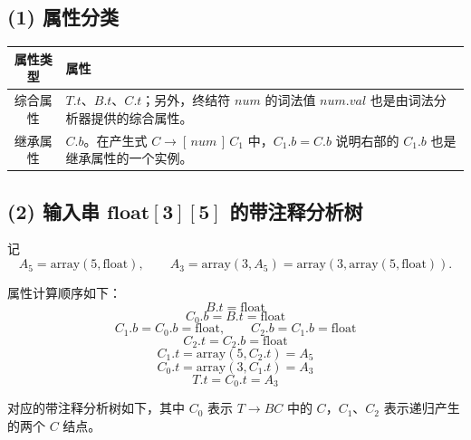 \documentclass[12pt]{article}
\begin{document}
\subsection*{(1) 属性分类}

\begin{center}
\begin{tabular}{|c|p{10cm}|}
\hline
属性类型 & 属性 \\
\hline
综合属性 & $T.t$、$B.t$、$C.t$；另外，终结符 $num$ 的词法值 $num.val$ 也是由词法分析器提供的综合属性。 \\
\hline
继承属性 & $C.b$。在产生式 $C \to [\,num\,]\,C_1$ 中，$C_1.b=C.b$ 说明右部的 $C_1.b$ 也是继承属性的一个实例。 \\
\hline
\end{tabular}
\end{center}

\subsection*{(2) 输入串 $\mathbf{float[3][5]}$ 的带注释分析树}

记
\[
A_5=\mathrm{array}(5,\mathrm{float}),\qquad
A_3=\mathrm{array}(3,A_5)=\mathrm{array}(3,\mathrm{array}(5,\mathrm{float})).
\]

属性计算顺序如下：
\[
B.t=\mathrm{float}
\]
\[
C_0.b=B.t=\mathrm{float}
\]
\[
C_1.b=C_0.b=\mathrm{float},\qquad C_2.b=C_1.b=\mathrm{float}
\]
\[
C_2.t=C_2.b=\mathrm{float}
\]
\[
C_1.t=\mathrm{array}(5,C_2.t)=A_5
\]
\[
C_0.t=\mathrm{array}(3,C_1.t)=A_3
\]
\[
T.t=C_0.t=A_3
\]

对应的带注释分析树如下，其中 $C_0$ 表示 $T\to BC$ 中的 $C$，$C_1$、$C_2$ 表示递归产生的两个 $C$ 结点。

\begin{center}
\end{center}
\end{document}
